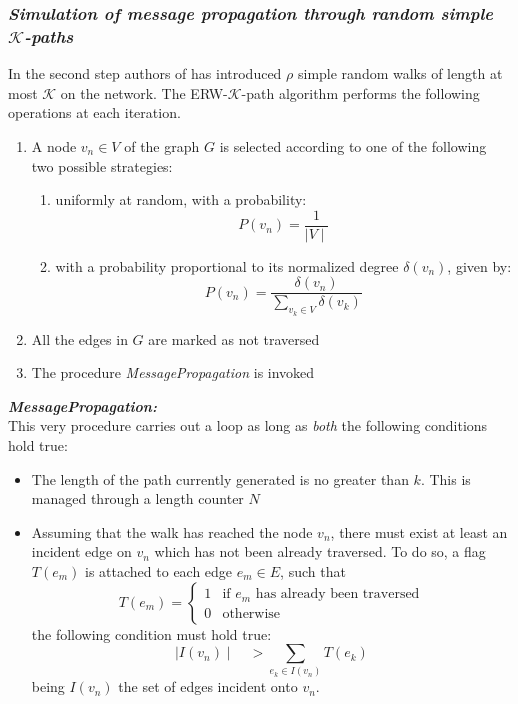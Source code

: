 \subsubsection*{\textit{Simulation of message propagation through random simple $\mathcal{K}$-paths}}
In the second step authors of \cite{ref-35} has introduced $\rho$ simple random walks of length at most $\mathcal{K}$ on the network. The ERW-$\mathcal{K}$-path algorithm performs the following operations at each iteration.
\begin{enumerate}
	\item A node $v_n \in V$ of the graph $G$ is selected according to one of the following two possible strategies:
	\begin{enumerate}[label=\alph*.]
		\item uniformly at random, with a probability:
		\begin{equation}
		P(v_n) = \dfrac{1}{\mid V \mid}
		\end{equation}
		\item with a probability proportional to its normalized degree $\delta(v_n)$, given by:
		\begin{equation}\label{probability-of-normalized-degree}
		P(v_n) = \dfrac{\delta(v_n)}{\sum_{v_k \in V} \delta(v_k)}
		\end{equation}
	\end{enumerate}
	\item All the edges in $G$ are marked as not traversed
	\item The procedure \textit{MessagePropagation} is invoked
\end{enumerate}
\textbf{\textit{MessagePropagation:}}\\
This very procedure carries out a loop as long as \textit{both} the following conditions hold true:
\begin{itemize}
	\item The length of the path currently generated is no greater than $k$. This is managed through a length counter $N$
	\item Assuming that the walk has reached the node $v_n$, there must exist at least an incident edge on $v_n$ which has not been already traversed. To do so, a flag $T(e_m)$ is attached to each edge $e_m \in E$, such that
	\begin{equation}
	T(e_m) = \begin{cases}
	1 & \text{if $e_m$ has already been traversed}\\
	0 & \text{otherwise}
	\end{cases} 
	\end{equation}
	the following condition must hold true:
	\begin{equation}
	\mid I(v_n) \mid \quad > \sum\limits_{e_k \in I(v_n)} T(e_k)
	\end{equation}
	being $I(v_n)$ the set of edges incident onto $v_n$.
\end{itemize}
